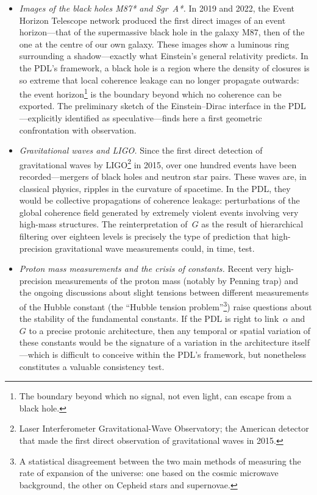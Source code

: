 \documentclass[12pt, a4paper, openright]{book}
\begin{document}
\begin{itemize}

\item \textit{Images of the black holes M87* and Sgr~A*.} In 2019 and 2022, the Event Horizon Telescope network produced the first direct images of an event horizon---that of the supermassive black hole in the galaxy M87, then of the one at the centre of our own galaxy. These images show a luminous ring surrounding a shadow---exactly what Einstein's general relativity predicts. In the PDL's framework, a black hole is a region where the density of closures is so extreme that local coherence leakage can no longer propagate outwards: the event horizon\footnote{The boundary beyond which no signal, not even light, can escape from a black hole.} is the boundary beyond which no coherence can be exported. The preliminary sketch of the Einstein--Dirac interface in the PDL---explicitly identified as speculative---finds here a first geometric confrontation with observation.

\item \textit{Gravitational waves and LIGO.} Since the first direct detection of gravitational waves by LIGO\footnote{Laser Interferometer Gravitational-Wave Observatory; the American detector that made the first direct observation of gravitational waves in 2015.} in 2015, over one hundred events have been recorded---mergers of black holes and neutron star pairs. These waves are, in classical physics, ripples in the curvature of spacetime. In the PDL, they would be collective propagations of coherence leakage: perturbations of the global coherence field generated by extremely violent events involving very high-mass structures. The reinterpretation of~$G$ as the result of hierarchical filtering over eighteen levels is precisely the type of prediction that high-precision gravitational wave measurements could, in time, test.

\item \textit{Proton mass measurements and the crisis of constants.} Recent very high-precision measurements of the proton mass (notably by Penning trap) and the ongoing discussions about slight tensions between different measurements of the Hubble constant (the ``Hubble tension problem''\footnote{A statistical disagreement between the two main methods of measuring the rate of expansion of the universe: one based on the cosmic microwave background, the other on Cepheid stars and supernovae.}) raise questions about the stability of the fundamental constants. If the PDL is right to link~$\alpha$ and~$G$ to a precise protonic architecture, then any temporal or spatial variation of these constants would be the signature of a variation in the architecture itself---which is difficult to conceive within the PDL's framework, but nonetheless constitutes a valuable consistency test.


\end{itemize}
\end{document}
